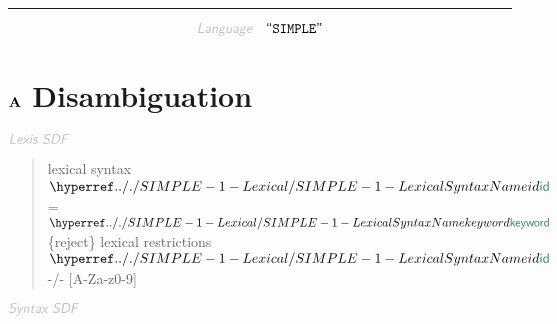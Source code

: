 

\begin{center}
\rule{3in}{0.4pt}
\end{center}

\begin{displaymath}
\KEY{Language} \quad \STRING{SIMPLE}
\end{displaymath}

\section{$\SECT{A}$ Disambiguation}\hypertarget{secta-disambiguation}{}\label{secta-disambiguation}

$\KEY{Lexis SDF}$

\begin{quote}
lexical syntax \newline
     $\SHADE{\SYNHYPER{../.}{SIMPLE-1-Lexical}{id}}$ = $\SHADE{\SYNHYPER{../.}{SIMPLE-1-Lexical}{keyword}}$ \{reject\}\newline
   \newline
   lexical restrictions\newline
     $\SHADE{\SYNHYPER{../.}{SIMPLE-1-Lexical}{id}}$ -/- {[}A-Za-z0-9{]}
\end{quote}

$\KEY{Syntax SDF}$

